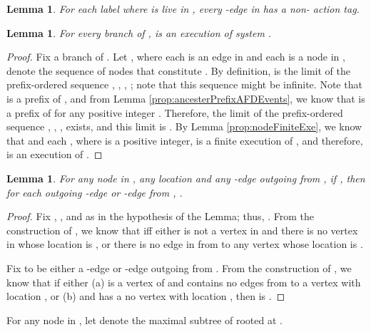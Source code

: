 \documentclass[11pt]{article}
\numberwithin{theorem}{section}
\newtheorem{lemma}[theorem]{Lemma}
\begin{document}
\begin{lemma}\label{prop:liveLocationNonBotAction}
For each label  where  is live in , every -edge in  has a non- action tag.
\end{lemma}



\begin{lemma}\label{lem:fairBranchUnfairExe}
For every branch  of ,  is an execution of system .
\end{lemma}
\begin{proof}
Fix a branch  of . Let , where each  is an edge in  and each  is a node in ,
denote the sequence of nodes that constitute . By definition,
 is the limit of the prefix-ordered sequence
, , , ; note that this sequence might be infinite. Note that
 is a prefix of
, and from Lemma
\ref{prop:ancesterPrefixAFDEvents}, we know that   is
a prefix of  for any positive integer
. Therefore, the limit of the prefix-ordered sequence
, , , 
exists, and this limit is . By Lemma
\ref{prop:nodeFiniteExe}, we know that  and each
, where  is a positive integer, is a finite execution of
, and therefore,  is an execution of . 
\end{proof}
\begin{lemma}\label{lem:crashedLocationNoOutgoingActions}
For any node  in , any location  and any -edge  outgoing from , if , then for each outgoing -edge or -edge  from , .
\end{lemma}
\begin{proof}
Fix , , and  as in the hypothesis of the Lemma; thus, . From the construction of , we know that  iff either  is not a vertex in  and there  is no vertex in  whose location is , or there is no edge in  from  to any vertex whose location is .

Fix  to be either a -edge or -edge outgoing from . From the construction of  , we know that if  either 
(a)  is a vertex of  and  contains no edges from  to a vertex with location , or (b)  and  has a no vertex with location , then  is . 
\end{proof}

For any node  in ,  let  denote the maximal subtree of  rooted at .
\end{document}
